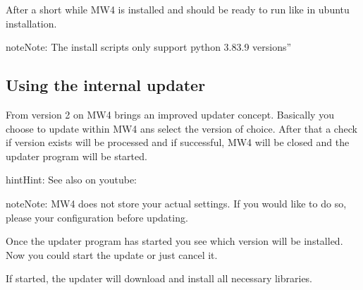 \documentclass[a4paper,10pt,english]{sphinxmanual}
\begin{document}
\sphinxAtStartPar
After a short while MW4 is installed and should be ready to run like in ubuntu
installation.

\begin{sphinxadmonition}{note}{Note:}
\sphinxAtStartPar
The install scripts only support python 3.8\sphinxhyphen{}3.9 versions”
\end{sphinxadmonition}

\sphinxstepscope


\subsection{Using the internal updater}
\label{\detokenize{install/update:using-the-internal-updater}}\label{\detokenize{install/update::doc}}
\sphinxAtStartPar
From version 2 on MW4 brings an improved updater concept. Basically you choose
to update within MW4 ans select the version of choice. After that a check if
version exists will be processed and if successful, MW4 will be closed and the
updater program will be started.

\begin{sphinxadmonition}{hint}{Hint:}
\sphinxAtStartPar
See also on youtube: 
\end{sphinxadmonition}

\begin{sphinxadmonition}{note}{Note:}
\sphinxAtStartPar
MW4 does not store your actual settings. If you would like to do so,
please  your configuration before updating.
\end{sphinxadmonition}


\sphinxAtStartPar
Once the updater program has started you see which version will be installed. Now
you could start the update or just cancel it.


\sphinxAtStartPar
If started, the updater will download and install all necessary libraries.

\end{document}
